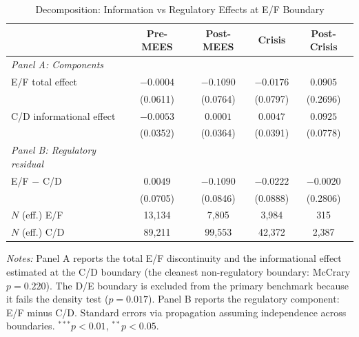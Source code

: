 \begin{table}[htbp]
\centering
\caption{Decomposition: Information vs Regulatory Effects at E/F Boundary}
\label{tab:decomposition}
\begin{tabular}{lcccc}
\toprule
 & Pre-MEES & Post-MEES & Crisis & Post-Crisis \\
\midrule
\textit{Panel A: Components} & & & & \\
\quad E/F total effect & $-0.0004$ & $-0.1090$ & $-0.0176$ & $0.0905$ \\
 & (0.0611) & (0.0764) & (0.0797) & (0.2696) \\
\addlinespace
\quad C/D informational effect & $-0.0053$ & $0.0001$ & $0.0047$ & $0.0925$ \\
 & (0.0352) & (0.0364) & (0.0391) & (0.0778) \\
\addlinespace
\textit{Panel B: Regulatory residual} & & & & \\
\quad E/F $-$ C/D & $0.0049$ & $-0.1090$ & $-0.0222$ & $-0.0020$ \\
 & (0.0705) & (0.0846) & (0.0888) & (0.2806) \\
\midrule
$N$ (eff.) E/F & 13,134 & 7,805 & 3,984 & 315 \\
$N$ (eff.) C/D & 89,211 & 99,553 & 42,372 & 2,387 \\
\bottomrule
\end{tabular}
\begin{minipage}{\textwidth}
\footnotesize
\textit{Notes:} Panel A reports the total E/F discontinuity and the informational effect
estimated at the C/D boundary (the cleanest non-regulatory boundary: McCrary $p = 0.220$).
The D/E boundary is excluded from the primary benchmark because it fails the density test ($p = 0.017$).
Panel B reports the regulatory component: E/F minus C/D.
Standard errors via propagation assuming independence across boundaries.
$^{***}p<0.01$, $^{**}p<0.05$.
\end{minipage}
\end{table}
